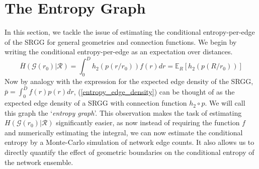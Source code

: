 \documentclass{article}
\newcommand{\graph}{\mathcal{G}}
\begin{document}
\section{The Entropy Graph}
\label{sec:entropy_graph}
    In this section, we tackle the issue of estimating the conditional entropy-per-edge of the SRGG for general geometries and connection functions. We begin by writing the conditional entropy-per-edge as an expectation over distances.
    \begin{equation}
        \label{entropy_edge_density}
        \overline{H}(\graph(r_0)|\mathcal{R}) = \int_0^D h_2(p(r/r_0))f(r)dr = \mathbb{E}_R[h_2(p(R/r_0))]
    \end{equation}
    Now by analogy with the expression for the expected edge density of the SRGG, $\bar{p} = \int_0^D f(r)p(r)dr$, (\ref{entropy_edge_density}) can be thought of as the expected edge density of a SRGG with connection function $h_2 \circ p$. We will call this graph the `\textit{entropy graph}'. This observation makes the task of estimating $H(\graph(r_0)|\mathcal{R})$ significantly easier, as now instead of requiring the function $f$ and numerically estimating the integral, we can now estimate the conditional entropy by a Monte-Carlo simulation of network edge counts. It also allows us to directly quantify the effect of geometric boundaries on the conditional entropy of the network ensemble.
    
\end{document}
